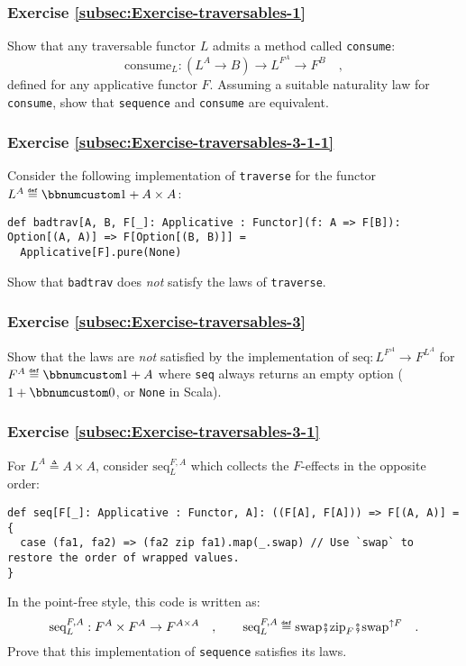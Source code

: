 \subsubsection{Exercise \label{subsec:Exercise-traversables-1}\ref{subsec:Exercise-traversables-1}}

Show that any traversable functor $L$ admits a method called \lstinline!consume!:
\[
\text{consume}_{L}:(L^{A}\rightarrow B)\rightarrow L^{F^{A}}\rightarrow F^{B}\quad,
\]
defined for any applicative functor $F$. Assuming a suitable naturality
law for \lstinline!consume!, show that \lstinline!sequence! and
\lstinline!consume! are equivalent.

\subsubsection{Exercise \label{subsec:Exercise-traversables-3-1-1}\ref{subsec:Exercise-traversables-3-1-1}}

Consider the following implementation of \lstinline!traverse! for
the functor $L^{A}\triangleq\bbnum 1+A\times A$:
\begin{lstlisting}
def badtrav[A, B, F[_]: Applicative : Functor](f: A => F[B]): Option[(A, A)] => F[Option[(B, B)]] =
  Applicative[F].pure(None)
\end{lstlisting}
Show that \lstinline!badtrav! does \emph{not} satisfy the laws of
\lstinline!traverse!.

\subsubsection{Exercise \label{subsec:Exercise-traversables-3}\ref{subsec:Exercise-traversables-3}}

Show that the laws are \emph{not} satisfied by the implementation
of $\text{seq}:L^{F^{A}}\rightarrow F^{L^{A}}$ for $F^{A}\triangleq\bbnum 1+A$
where \lstinline!seq! always returns an empty option ($1+\bbnum 0$,
or \lstinline!None! in Scala).

\subsubsection{Exercise \label{subsec:Exercise-traversables-3-1}\ref{subsec:Exercise-traversables-3-1}}

For $L^{A}\triangleq A\times A$, consider $\text{seq}_{L}^{F,A}$
which collects the $F$-effects in the opposite order:
\begin{lstlisting}
def seq[F[_]: Applicative : Functor, A]: ((F[A], F[A])) => F[(A, A)] = {
  case (fa1, fa2) => (fa2 zip fa1).map(_.swap) // Use `swap` to restore the order of wrapped values.
}
\end{lstlisting}
In the point-free style, this code is written as:
\[
\text{seq}_{L}^{F,A}:F^{A}\times F^{A}\rightarrow F^{A\times A}\quad,\quad\quad\text{seq}_{L}^{F,A}\triangleq\text{swap}\bef\text{zip}_{F}\bef\text{swap}^{\uparrow F}\quad.
\]
Prove that this implementation of \lstinline!sequence! satisfies
its laws.

